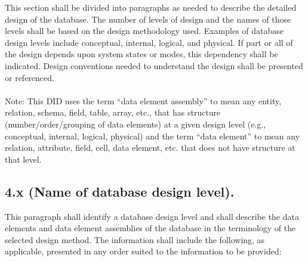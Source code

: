 This section shall be divided into paragraphs as needed to describe the
detailed design of the database. The number of levels of design and the
names of those levels shall be based on the design methodology used.
Examples of database design levels include conceptual, internal,
logical, and physical. If part or all of the design depends upon system
states or modes, this dependency shall be indicated. Design conventions
needed to understand the design shall be presented or referenced. \\\\
Note: This DID uses the term ``data element assembly'' to mean any
entity, relation, schema, field, table, array, etc., that has structure
(number/order/grouping of data elements) at a given design level (e.g.,
conceptual, internal, logical, physical) and the term ``data element''
to mean any relation, attribute, field, cell, data element, etc. that
does not have structure at that level.

\subsection{4.x (Name of database design level).}

This paragraph shall identify a database design level and shall describe
the data elements and data element assemblies of the database in the
terminology of the selected design method. The information shall include
the following, as applicable, presented in any order suited to the
information to be provided:

